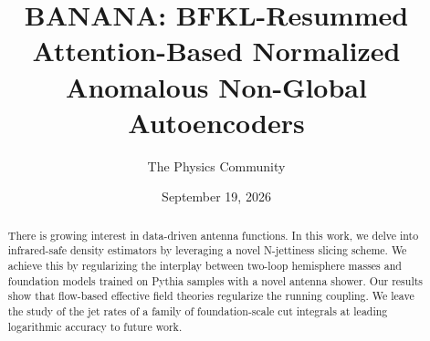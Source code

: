 \documentclass[11pt]{article}
\title{BANANA: BFKL-Resummed Attention-Based Normalized Anomalous Non-Global Autoencoders}
\author{The Physics Community}
\date{September 19, 2026}
\numberwithin{equation}{section}
\theoremstyle{definition}
\theoremstyle{remark}
\begin{document}
\maketitle
\begin{abstract}
There is growing interest in data-driven antenna functions. In this
work, we delve into infrared-safe density estimators by leveraging a
novel N-jettiness slicing scheme. We achieve this by regularizing the
interplay between two-loop hemisphere masses and foundation models
trained on Pythia samples with a novel antenna shower. Our results show
that flow-based effective field theories regularize the running
coupling. We leave the study of the jet rates of a family of
foundation-scale cut integrals at leading logarithmic accuracy to future
work.
\end{abstract}
\tableofcontents





\nocite{*}


\end{document}
